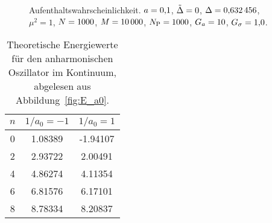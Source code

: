 \begin{figure}[htbp]
    \centering
    \caption{%
        Aufenthaltswahrscheinlichkeit. $a = \num{0.1}$,
        $\tilde \Delta = \num{0}$, $\Delta = \num{0.632456}$, $\mu^2 =
        \num{1}$, $N = \num{1000}$, $M = \num{10000}$,
        $N_\text P = \num{1000}$, $G_a = \num{10}$,
        $G_\sigma = \num{1.0}$.
    }
    \label{fig:histogram_gauss}
\end{figure}

\begin{table}[htbp]
    \centering
    \begin{tabular}{SSS}
        {$n$} & {$1/a_0 = -1$} & {$1/a_0 = 1$} \\
         & 1.08389 & -1.94107 \\
        2 & 2.93722 & 2.00491 \\
        4 & 4.86274 & 4.11354 \\
        6 & 6.81576 & 6.17101 \\
        8 & 8.78334 & 8.20837
    \end{tabular}
    \caption{%
        Theoretische Energiewerte für den anharmonischen Oszillator im
        Kontinuum, abgelesen aus Abbildung~\ref{fig:E_a0}.
    }
    \label{tab:E_a0}
\end{table}

